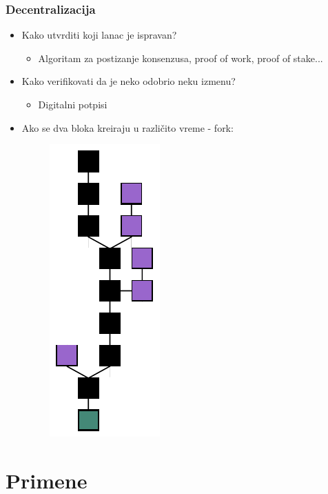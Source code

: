 \documentclass{beamer}
\begin{document}
\begin{frame}[fragile]\frametitle{Decentralizacija}
	\begin{itemize}
		\item Kako utvrditi koji lanac je ispravan?
		\begin{itemize}
			\item Algoritam za postizanje konsenzusa, proof of work, proof of stake...
		\end{itemize}
		\item Kako verifikovati da je neko odobrio neku izmenu?
		\begin{itemize}
			\item Digitalni potpisi
		\end{itemize}
		\item Ako se dva bloka kreiraju u različito vreme - fork:
		\begin{figure}[H]
			\includegraphics[scale=0.7,angle=-90,origin=c]{blockchain_fork.pdf}
		\end{figure}
	\end{itemize}
\end{frame}


\section{Primene}
\end{document}
